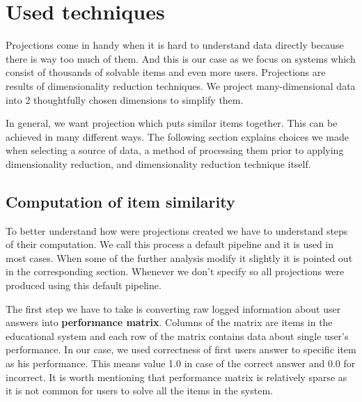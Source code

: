 \documentclass[
  digital, %
  table,   %
  nolof,     %
  nolot,     %
  nocover
]{fithesis3}
\begin{document}

\section{Used techniques}\label{Used techniques}


Projections come in handy when it is hard to understand data directly because there is way too much of them. And this is our case as we focus on systems which consist of thousands of solvable items and even more users. Projections are results of dimensionality reduction techniques. We project many-dimensional data into 2 thoughtfully chosen dimensions to simplify them.


In general, we want projection which puts similar items together. This can be achieved in many different ways. The following section explains choices we made when selecting a source of data, a method of processing them prior to applying dimensionality reduction, and dimensionality reduction technique itself.


\subsection{Computation of item similarity}\label{computation-of-item-similarity}


To better understand how were projections created we have to understand steps of their computation. We call this process a default pipeline and it is used in most cases. When some of the further analysis modify it slightly it is pointed out in the corresponding section. Whenever we don't specify so all projections were produced using this default pipeline.


The first step we have to take is converting raw logged information about user answers into \textbf{performance matrix}. Columns of the matrix are items in the educational system and each row of the matrix contains data about single user's performance. In our case, we used correctness of first users answer to specific item as his performance. This means value 1.0 in case of the correct answer and 0.0 for incorrect. It is worth mentioning that performance matrix is relatively sparse as it is not common for users to solve all the items in the system.
\end{document}
